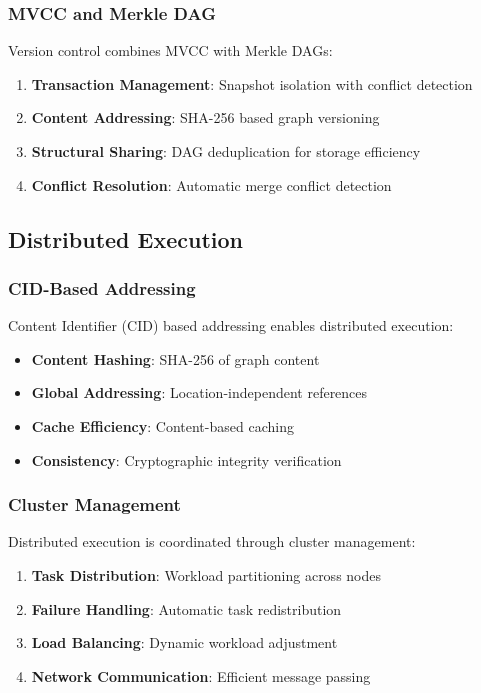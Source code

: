\documentclass[11pt,a4paper]{article}
\begin{document}
\subsubsection{MVCC and Merkle DAG}
\label{subsubsec:mvcc_merkle}

Version control combines MVCC with Merkle DAGs:

\begin{enumerate}
\item \textbf{Transaction Management}: Snapshot isolation with conflict detection
\item \textbf{Content Addressing}: SHA-256 based graph versioning
\item \textbf{Structural Sharing}: DAG deduplication for storage efficiency
\item \textbf{Conflict Resolution}: Automatic merge conflict detection
\end{enumerate}

\subsection{Distributed Execution}
\label{subsec:distributed}

\subsubsection{CID-Based Addressing}
\label{subsubsec:cid_addressing}

Content Identifier (CID) based addressing enables distributed execution:

\begin{itemize}
\item \textbf{Content Hashing}: SHA-256 of graph content
\item \textbf{Global Addressing}: Location-independent references
\item \textbf{Cache Efficiency}: Content-based caching
\item \textbf{Consistency}: Cryptographic integrity verification
\end{itemize}

\subsubsection{Cluster Management}
\label{subsubsec:cluster_management}

Distributed execution is coordinated through cluster management:

\begin{enumerate}
\item \textbf{Task Distribution}: Workload partitioning across nodes
\item \textbf{Failure Handling}: Automatic task redistribution
\item \textbf{Load Balancing}: Dynamic workload adjustment
\item \textbf{Network Communication}: Efficient message passing
\end{enumerate}
\end{document}
